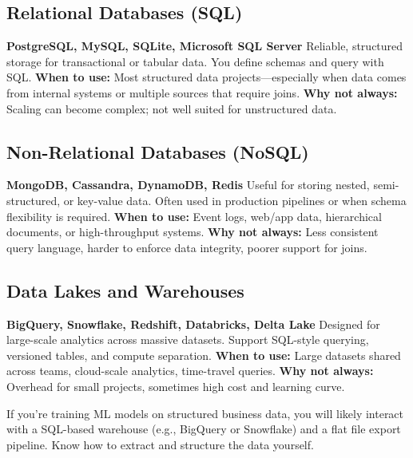 \documentclass[12pt,openany]{book}
\begin{document}
\subsection*{Relational Databases (SQL)}

\textbf{PostgreSQL, MySQL, SQLite, Microsoft SQL Server} \newline
Reliable, structured storage for transactional or tabular data. You define schemas and query with SQL. \newline
\textbf{When to use:} Most structured data projects—especially when data comes from internal systems or multiple sources that require joins. \newline
\textbf{Why not always:} Scaling can become complex; not well suited for unstructured data.

\subsection*{Non-Relational Databases (NoSQL)}

\textbf{MongoDB, Cassandra, DynamoDB, Redis} \newline
Useful for storing nested, semi-structured, or key-value data. Often used in production pipelines or when schema flexibility is required. \newline
\textbf{When to use:} Event logs, web/app data, hierarchical documents, or high-throughput systems. \newline
\textbf{Why not always:} Less consistent query language, harder to enforce data integrity, poorer support for joins.

\subsection*{Data Lakes and Warehouses}

\textbf{BigQuery, Snowflake, Redshift, Databricks, Delta Lake} \newline
Designed for large-scale analytics across massive datasets. Support SQL-style querying, versioned tables, and compute separation. \newline
\textbf{When to use:} Large datasets shared across teams, cloud-scale analytics, time-travel queries. \newline
\textbf{Why not always:} Overhead for small projects, sometimes high cost and learning curve.

\begin{notebox}
If you're training ML models on structured business data, you will likely interact with a SQL-based warehouse (e.g., BigQuery or Snowflake) and a flat file export pipeline. Know how to extract and structure the data yourself.
\end{notebox}
\end{document}
